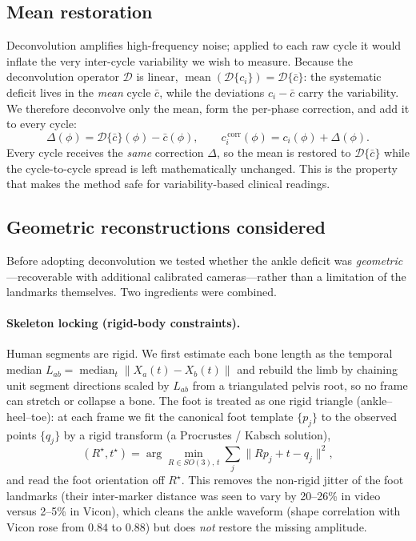 \documentclass[11pt]{article}
\begin{document}
\subsection{Mean restoration}
Deconvolution amplifies high-frequency noise; applied to each raw cycle it would inflate the very inter-cycle variability we wish to measure. Because the deconvolution operator $\mathcal{D}$ is linear, $\operatorname{mean}(\mathcal{D}\{c_i\}) = \mathcal{D}\{\bar c\}$: the systematic deficit lives in the \emph{mean} cycle $\bar c$, while the deviations $c_i-\bar c$ carry the variability. We therefore deconvolve only the mean, form the per-phase correction, and add it to every cycle:
\begin{equation}
\Delta(\phi) = \mathcal{D}\{\bar c\}(\phi) - \bar c(\phi), \qquad
c_i^{\,\mathrm{corr}}(\phi) = c_i(\phi) + \Delta(\phi).
\end{equation}
Every cycle receives the \emph{same} correction $\Delta$, so the mean is restored to $\mathcal{D}\{\bar c\}$ while the cycle-to-cycle spread is left mathematically unchanged. This is the property that makes the method safe for variability-based clinical readings.

\subsection{Geometric reconstructions considered}
\label{sec:geom}
Before adopting deconvolution we tested whether the ankle deficit was \emph{geometric}---recoverable with additional calibrated cameras---rather than a limitation of the landmarks themselves. Two ingredients were combined.

\paragraph{Skeleton locking (rigid-body constraints).} Human segments are rigid. We first estimate each bone length as the temporal median $L_{ab}=\operatorname{median}_t\|X_a(t)-X_b(t)\|$ and rebuild the limb by chaining unit segment directions scaled by $L_{ab}$ from a triangulated pelvis root, so no frame can stretch or collapse a bone. The foot is treated as one rigid triangle (ankle--heel--toe): at each frame we fit the canonical foot template $\{p_j\}$ to the observed points $\{q_j\}$ by a rigid transform (a Procrustes / Kabsch solution),
\begin{equation}
(R^\star,t^\star)=\arg\min_{R\in SO(3),\,t}\sum_j \big\|R p_j + t - q_j\big\|^2,
\end{equation}
and read the foot orientation off $R^\star$. This removes the non-rigid jitter of the foot landmarks (their inter-marker distance was seen to vary by 20--26\% in video versus 2--5\% in Vicon), which cleans the ankle waveform (shape correlation with Vicon rose from $0.84$ to $0.88$) but does \emph{not} restore the missing amplitude.
\end{document}
